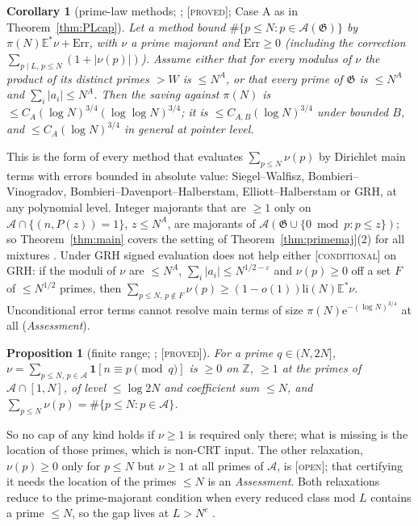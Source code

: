 \documentclass[10pt,reqno]{amsart}
\newtheorem{corollary}[theorem]{Corollary}
\newtheorem{proposition}[theorem]{Proposition}
\theoremstyle{definition}
\theoremstyle{remark}
\newcommand{\A}{\mathcal A}
\newcommand{\cG}{\mathfrak G}
\newcommand{\E}{\mathbb E}
\newcommand{\Z}{\mathbb Z}
\newcommand{\ind}{\mathbf 1}
\newcommand{\e}{\mathrm e}
\newcommand{\lab}[1]{\textup{[\textsc{#1}]}}
\begin{document}
\begin{corollary}[prime-law methods; {\cite[Cor.~4.2]{PL}}; \lab{proved}; Case A as in Theorem~\ref{thm:PLcap}]\label{cor:PLmethods}
Let a method bound $\#\{p\leq N:p\in\A(\cG)\}$ by $\pi(N)\E^*\nu+\mathrm{Err}$, with $\nu$ a
prime majorant and $\mathrm{Err}\geq0$ (including the correction
$\sum_{p\mid L,\,p\leq N}(1+|\nu(p)|)$).  Assume either that for every modulus of
$\nu$ the product of its distinct primes $>W$ is $\leq N^A$, or that every
prime of $\cG$ is $\leq N^A$ and $\sum_i|a_i|\leq N^A$.  Then the saving against
$\pi(N)$ is $\leq C_A(\log N)^{3/4}(\log\log N)^{3/4}$; it is $\leq C_{A,B}(\log N)^{3/4}$
under bounded $B$, and $\leq C_A(\log N)^{3/4}$ in general at pointer level.
\end{corollary}
This is the form of every method that evaluates $\sum_{p\leq N}\nu(p)$ by
Dirichlet main terms with errors bounded in absolute value:
Siegel--Walfisz, Bombieri--Vinogradov, Bombieri--Davenport--Halberstam,
Elliott--Halberstam or GRH, at any polynomial level.  Integer majorants
that are $\geq1$ only on $\A\cap\{(n,P(z))=1\}$, $z\leq N^A$, are majorants of
$\A(\cG\cup\{0\bmod p:p\leq z\})$; so Theorem~\ref{thm:main} covers the setting of
Theorem~\ref{thm:primemaj}(2) for all mixtures \cite[\S4.4]{PL}.  Under GRH
signed evaluation does not help either \cite[Prop.~4.3]{PL}
\lab{conditional} on GRH: if the moduli of $\nu$ are $\leq N^A$,
$\sum_i|a_i|\leq N^{1/2-\varepsilon}$ and $\nu(p)\geq0$ off a set $F$ of $\leq N^{1/2}$ primes,
then $\sum_{p\leq N,\,p\notin F}\nu(p)\geq(1-o(1))\mathrm{li}(N)\E^*\nu$.  Unconditional error
terms cannot resolve main terms of size $\pi(N)\e^{-(\log N)^{3/4}}$ at all
\cite[\S6.3]{LS2} (\emph{Assessment}).

\begin{proposition}[finite range; {\cite[Prop.~6.1]{LS2}}; \lab{proved}]\label{prop:finiterange}
For a prime $q\in(N,2N]$, $\nu=\sum_{p\leq N,\,p\in\A}\ind[n\equiv p\pmod q]$ is $\geq0$ on $\Z$,
$\geq1$ at the primes of $\A\cap[1,N]$, of level $\leq\log2N$ and coefficient sum
$\leq N$, and $\sum_{p\leq N}\nu(p)=\#\{p\leq N:p\in\A\}$.
\end{proposition}
So no cap of any kind holds if $\nu\geq1$ is required only there; what is
missing is the location of those primes, which is non-CRT input.  The other relaxation, $\nu(p)\geq0$ only for $p\leq N$ but $\nu\geq1$ at
all primes of $\A$, is \lab{open}; that certifying it needs the location of
the primes $\leq N$ is an \emph{Assessment}.  Both relaxations reduce to
the prime-majorant condition when every reduced class mod $L$ contains a
prime $\leq N$, so the gap lives at $L>N^c$ \cite[\S6]{PL}.
\end{document}
